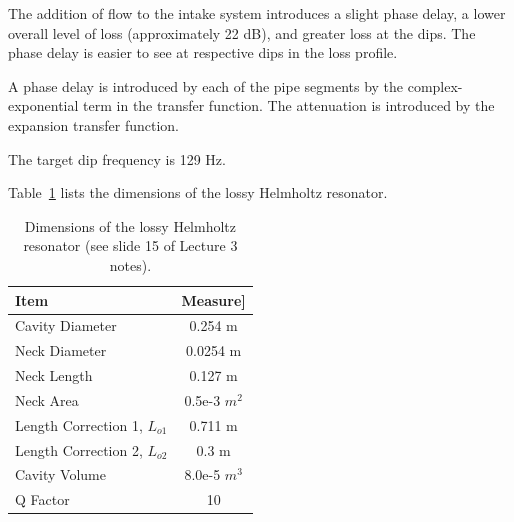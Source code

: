 {{{\vspace{0.25cm}
The addition of flow to the intake system introduces a slight phase delay, a lower overall level of loss (approximately 22 dB), and greater loss at the dips.  The phase delay is easier to see at respective dips in the loss profile.

A phase delay is introduced by each of the pipe segments by the complex-exponential term in the transfer function.  The attenuation is introduced by the expansion transfer function.

\newpage
The target dip frequency is 129 Hz.

Table~\ref{table:helmholzResonator} lists the dimensions of the lossy Helmholtz resonator.

\setlength{\abovecaptionskip}{0pt}
\vspace{0.1cm}
{\renewcommand{\arraystretch}{1.5}
\begin{table}[h!]
    \begin{center}
        \small
        \begin{tabular}{ | l | c | }
            \hline
            \textbf{Item}  &  \textbf{Measure]}  \\
            \hline
                Cavity Diameter                 &  0.254 m  \\
                \hline
                \rowcolor{Gray}
                Neck Diameter                   &  0.0254 m  \\
                \hline
                Neck Length                     &  0.127 m  \\
                \hline
                \rowcolor{Gray}
                Neck Area                       &  0.5e-3 $m^2$  \\
                \hline
                Length Correction 1, $L_{o1}$   &  0.711 m  \\
                \hline
                \rowcolor{Gray}
                Length Correction 2, $L_{o2}$   &  0.3 m  \\
                \hline
                Cavity Volume                   &  8.0e-5 $m^3$  \\
                \hline
                \rowcolor{Gray}
                Q Factor   &  10  \\
            \hline
        \end{tabular}
    \end{center}
    \caption{Dimensions of the lossy Helmholtz resonator (see slide 15 of Lecture 3 notes).}
    \label{table:helmholzResonator}
\end{table}

}}}}
